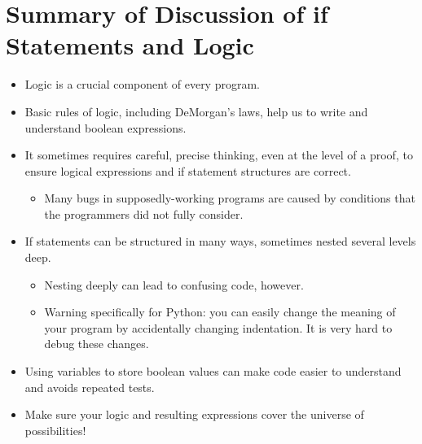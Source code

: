 \documentclass[letterpaper,10pt,english]{sphinxmanual}
\begin{document}
\section{Summary of Discussion of if Statements and Logic}
\label{\detokenize{lecture_notes/lec11_conditionals2:summary-of-discussion-of-if-statements-and-logic}}\begin{itemize}
\item {} 
Logic is a crucial component of every program.

\item {} 
Basic rules of logic, including DeMorgan’s laws, help us to write and
understand boolean expressions.

\item {} 
It sometimes requires careful, precise thinking, even at the level of
a proof, to ensure logical expressions and if statement structures
are correct.
\begin{itemize}
\item {} 
Many bugs in supposedly-working programs are caused by conditions
that the programmers did not fully consider.

\end{itemize}

\item {} 
If statements can be structured in many ways, sometimes nested several
levels deep.
\begin{itemize}
\item {} 
Nesting deeply can lead to confusing code, however.

\item {} 
Warning specifically for Python: you can easily change the meaning of
your program by accidentally changing indentation. It is very
hard to debug these changes.

\end{itemize}

\item {} 
Using variables to store boolean values can make code easier to
understand and avoids repeated tests.

\item {} 
Make sure your logic and resulting expressions cover the universe of
possibilities!

\end{itemize}
\end{document}
